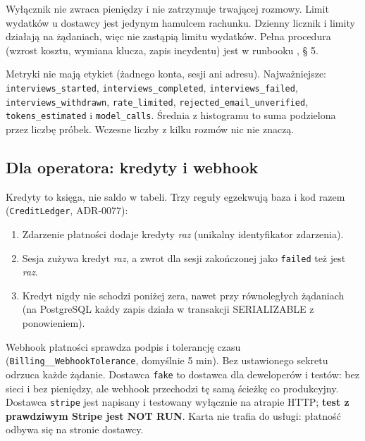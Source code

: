 {Wyłącznik nie zwraca pieniędzy i nie zatrzymuje trwającej rozmowy. Limit
wydatków u dostawcy jest jedynym hamulcem rachunku. Dzienny licznik i limity
działają na żądaniach, więc nie zastąpią limitu wydatków. Pełna procedura
(wzrost kosztu, wymiana klucza, zapis incydentu) jest w runbooku
, § 5.

Metryki nie mają etykiet (żadnego konta, sesji ani adresu). Najważniejsze:
\texttt{interviews\_\allowbreak{}started}, \texttt{interviews\_\allowbreak{}completed},
\texttt{interviews\_\allowbreak{}failed}, \texttt{interviews\_\allowbreak{}withdrawn}, \texttt{rate\_\allowbreak{}limited},
\texttt{rejected\_\allowbreak{}email\_\allowbreak{}unverified}, \texttt{tokens\_\allowbreak{}estimated} i
\texttt{model\_\allowbreak{}calls}. Średnia z histogramu to suma podzielona przez liczbę próbek.
Wczesne liczby z kilku rozmów nic nie znaczą.

\subsection{Dla operatora: kredyty i webhook}

Kredyty to księga, nie saldo w tabeli. Trzy reguły egzekwują baza i kod razem
(\texttt{CreditLedger}, ADR-0077):

\begin{enumerate}[leftmargin=*,itemsep=2pt]
  \item Zdarzenie płatności dodaje kredyty \emph{raz} (unikalny identyfikator
        zdarzenia).
  \item Sesja zużywa kredyt \emph{raz}, a zwrot dla sesji zakończonej jako
        \texttt{failed} też jest \emph{raz}.
  \item Kredyt nigdy nie schodzi poniżej zera, nawet przy równoległych żądaniach
        (na PostgreSQL każdy zapis działa w transakcji SERIALIZABLE z ponowieniem).
\end{enumerate}

Webhook płatności sprawdza podpis i tolerancję czasu (\texttt{Billing\_\allowbreak{}\_\allowbreak{}WebhookTolerance},
domyślnie 5 min). Bez ustawionego sekretu odrzuca każde żądanie. Dostawca
\texttt{fake} to dostawca dla deweloperów i testów: bez sieci i bez pieniędzy,
ale webhook przechodzi tę samą ścieżkę co produkcyjny. Dostawca \texttt{stripe}
jest napisany i testowany wyłącznie na atrapie HTTP; \textbf{test z prawdziwym
Stripe jest NOT RUN}. Karta nie trafia do usługi: płatność odbywa się na stronie
dostawcy.

}
